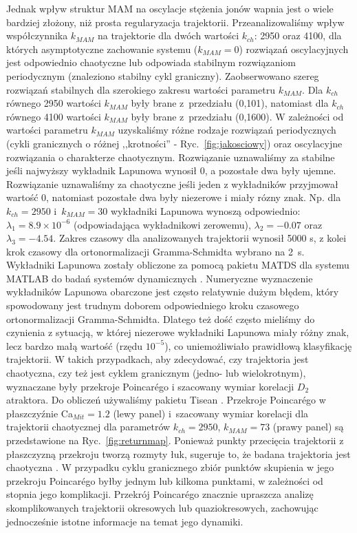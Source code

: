 Jednak wpływ struktur MAM na oscylacje stężenia jonów wapnia jest o wiele bardziej złożony, niż prosta regularyzacja trajektorii. Przeanalizowaliśmy wpływ współczynnika $k_{MAM}$ na trajektorie dla dwóch wartości $k_{ch}$: 2950 oraz 4100, dla których asymptotyczne  zachowanie systemu ($k_{MAM} = 0$) rozwiązań oscylacyjnych  jest odpowiednio chaotyczne lub odpowiada stabilnym rozwiązaniom periodycznym (znaleziono stabilny cykl graniczny). Zaobserwowano szereg rozwiązań stabilnych dla szerokiego zakresu wartości parametru $k_{MAM}$. Dla $k_{ch}$ równego 2950 wartości $k_{MAM}$ były brane z~przedziału (0,101), natomiast dla $k_{ch}$ równego 4100 wartości $k_{MAM}$ były brane z~przedziału (0,1600). W zależności od wartości parametru $k_{MAM}$ uzyskaliśmy różne rodzaje rozwiązań periodycznych (cykli granicznych o różnej ,,krotności'' - Ryc.~\ref{fig:jakosciowy}) oraz oscylacyjne rozwiązania o charakterze chaotycznym. Rozwiązanie uznawaliśmy za stabilne jeśli najwyższy wykładnik Lapunowa wynosił 0, a pozostałe dwa były ujemne. Rozwiązanie uznawaliśmy za chaotyczne jeśli jeden z wykładników przyjmował wartość 0, natomiast pozostałe dwa były niezerowe i miały rózny znak. Np. dla $k_{ch}=2950$ i~$k_{MAM}=30$ wykładniki Lapunowa wynoszą odpowiednio: $\lambda_1=8.9 \times 10^{-6}$ (odpowiadająca wykładnikowi zerowemu), $\lambda_2=-0.07$ oraz $\lambda_3=-4.54$. Zakres czasowy dla analizowanych trajektorii wynosił 5000 s, z kolei krok czasowy dla ortonormalizacji  Gramma-Schmidta wybrano na 2~s. Wykładniki Lapunowa zostały obliczone za pomocą pakietu MATDS dla systemu MATLAB do badań systemów dynamicznych \cite{Govorukhin2009}. Numeryczne wyznaczenie wykładników Lapunowa obarczone jest często relatywnie dużym błędem, który spowodowany jest trudnym doborem odpowiedniego kroku czasowego ortonormalizacji Gramma-Schmidta. Dlatego też dość często mieliśmy do czynienia z sytuacją, w której niezerowe wykładniki Lapunowa miały różny znak, lecz bardzo małą wartość (rzędu $10^{-5}$), co uniemożliwiało prawidłową klasyfikację trajektorii. W takich przypadkach, aby zdecydować, czy trajektoria jest chaotyczna, czy też jest cyklem granicznym (jedno- lub wielokrotnym), wyznaczane były przekroje Poincar\'ego i szacowany wymiar korelacji $D_2$ atraktora. Do obliczeń używaliśmy pakietu Tisean \cite{Hegger1999,Kantz2004}. Przekroje  Poincar\'ego w płaszczyźnie Ca$_{Mit}=1.2$ (lewy panel) i~szacowany wymiar korelacji dla trajektorii chaotycznej dla parametrów $k_{ch}=2950$, $k_{MAM}=73$ (prawy panel) są przedstawione na Ryc.~\ref{fig:returnmap}. Ponieważ punkty przecięcia trajektorii z płaszczyzną przekroju tworzą rozmyty łuk, sugeruje to, że badana trajektoria jest chaotyczna \cite{Ozer2005}. W przypadku cyklu granicznego zbiór punktów skupienia w jego przekroju Poincar\'ego byłby jednym lub kilkoma punktami, w zależności od stopnia jego komplikacji. Przekrój Poincar\'ego znacznie upraszcza analizę skomplikowanych trajektorii okresowych lub quaziokresowych, zachowując jednocześnie istotne informacje na temat jego dynamiki.

